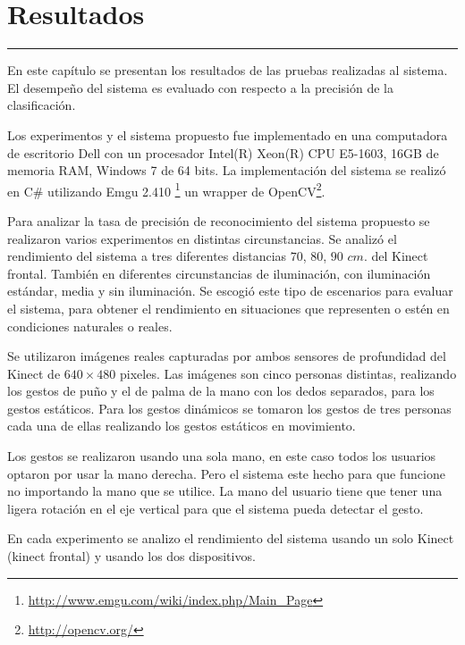 \chapter{Resultados}\label{capit:cap5}
\vspace{-2.0325ex}%
\noindent
\rule{\textwidth}{0.5pt}
\vspace{-5.5ex}%
\newcommand{\pushline}{\Indp}%

En este capítulo se presentan los resultados de las pruebas realizadas al sistema. El desempeño del sistema es evaluado con respecto a la precisi\'on de la clasificación.   

Los experimentos y el sistema propuesto fue implementado en una computadora de escritorio Dell con un procesador Intel(R) Xeon(R) CPU E5-1603, 16GB de memoria RAM, Windows 7 de 64 bits. La implementación del sistema se realizó en C\# utilizando Emgu 2.410 \footnote{\url{http://www.emgu.com/wiki/index.php/Main\_Page}} un wrapper de OpenCV\footnote{\url{http://opencv.org/}}. 

Para analizar la tasa de precisión de reconocimiento del sistema propuesto se realizaron varios experimentos en distintas circunstancias. Se analizó el rendimiento del sistema a tres diferentes distancias $70$, $80$, $90$ $cm.$ del Kinect frontal. También en diferentes circunstancias de iluminación, con iluminación estándar, media y sin iluminación. Se escogió este tipo de escenarios para evaluar el sistema, para obtener el rendimiento en situaciones que representen o estén en condiciones naturales o reales.

Se utilizaron imágenes reales capturadas por ambos sensores de profundidad del Kinect de $640 \times 480$ pixeles. Las imágenes son cinco personas distintas, realizando los gestos de puño y el de palma de la mano con los dedos separados, para los gestos estáticos. Para los gestos dinámicos se tomaron los gestos de tres personas cada una de ellas realizando los gestos estáticos en movimiento.

Los gestos se realizaron usando una sola mano, en este caso todos los usuarios optaron por usar la mano derecha. Pero el sistema este hecho para que funcione no importando la mano que se utilice. La mano del usuario tiene que tener una ligera rotación en el eje vertical para que el sistema pueda detectar el gesto.

En cada experimento se analizo el rendimiento del sistema usando un solo Kinect (kinect frontal) y usando los dos dispositivos.  


